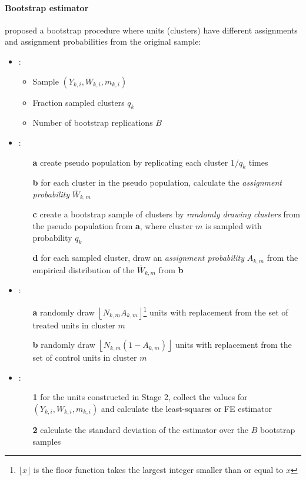 \documentclass[twoside]{article}
\begin{document}
\paragraph*{Bootstrap estimator}
\citet{abadie2023should} proposed a bootstrap procedure where units (clusters) have different assignments and assignment probabilities from the original sample: 
\begin{itemize}
    \item {}:
    \begin{itemize}
        \item Sample $\left(Y_{k,i},W_{k,i},m_{k,i}\right)$
        \item Fraction sampled clusters $q_k$
        \item Number of bootstrap replications $B$
    \end{itemize}
    \item {}:
    \begin{itemize}
        \item[\textbf{a}] create pseudo population by replicating each cluster $1/q_k$ times 
        \item[\textbf{b}] for each cluster in the pseudo population, calculate the \textit{assignment probability} $\bar{W}_{k,m}$
        \item[\textbf{c}] create a bootstrap sample of clusters by \textit{randomly drawing clusters} from the pseudo population from \textbf{a}, where cluster $m$ is sampled with probability $q_k$
        \item[\textbf{d}] for each sampled cluster, draw an \textit{assignment probability} $A_{k,m}$ from the empirical distribution of the $\bar{W}_{k,m}$ from \textbf{b}
    \end{itemize}
    \item {}:
    \begin{itemize}
        \item[\textbf{a}] randomly draw $\left\lfloor N_{k,m}A_{k,m} \right\rfloor$\footnote{$\lfloor x\rfloor$ is the floor function takes the largest integer smaller than or equal to $x$} units with replacement from the set of treated units in cluster $m$
        \item[\textbf{b}] randomly draw $\left\lfloor N_{k,m}(1-A_{k,m}) \right\rfloor$ units with replacement from the set of control units in cluster $m$
    \end{itemize}
    \item {}:
    \begin{itemize}
        \item[\textbf{1}] for the units constructed in Stage 2, collect the values for $\left(Y_{k,i},W_{k,i},m_{k,i}\right)$ and calculate the least-squares or FE estimator 
        \item[\textbf{2}] calculate the standard deviation of the estimator over the $B$ bootstrap samples 
    \end{itemize}
\end{itemize}
\end{document}

